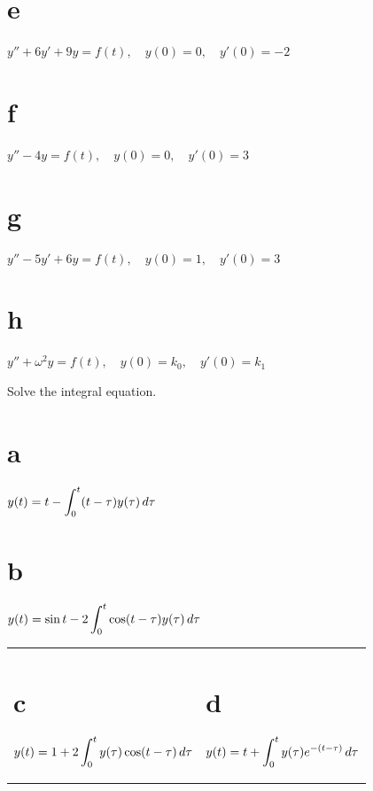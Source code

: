 \begin{exerciselist}
\begin{description}
    \item \part{e} $y''+6y'+9y=f(t),\quad y(0)=0,\quad y'(0)=-2$

    \item \part{f} $y''-4y=f(t),\quad y(0)=0,\quad y'(0)=3$

    \item \part{g} $y''-5y'+6y=f(t),\quad y(0)=1,\quad y'(0)=3$

    \item \part{h} $y''+\omega^{2}y=f(t),\quad y(0)=k_{0},\quad y'(0)=k_{1}$
  \end{description}

  \item\label{exer:8.6.4} Solve the integral equation.

  \begin{description}
    \item \part{a} $\displaystyle{y(t)=t-\int_{0}^{t}(t-\tau) y(\tau)\,d\tau}$

    \item \part{b} $\displaystyle{y(t)=\sin t-2 \int_{0}^{t}\cos(t-\tau)y(\tau)\,d\tau}$

    \item
      \begin{tabular}[t]{@{}p{168pt}@{}p{168pt}}
        \part{c} $\displaystyle{y(t)=1+2 \int_{0}^{t}y(\tau)\cos(t-\tau)\,d\tau}$ & \part{d} $\displaystyle{y(t)=t+\int_{0}^{t} y(\tau)e^{-(t-\tau)}\,d\tau}$
      \end{tabular}


\end{description}
\end{exerciselist}
